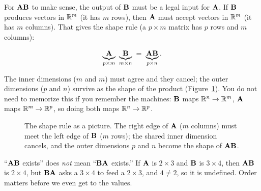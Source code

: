For $\mathbf{A}\mathbf{B}$ to make sense, the output of $\mathbf{B}$ must be a legal input for
$\mathbf{A}$. If $\mathbf{B}$ produces vectors in $\mathbb{R}^m$ (it has $m$ rows), then $\mathbf{A}$
must accept vectors in $\mathbb{R}^m$ (it has $m$ columns). That gives the shape rule
(a $p\times m$ matrix has $p$ rows and $m$ columns):

\[
\underbrace{\mat{A}}_{p \times m}\ \underbrace{\mat{B}}_{m \times n}
\;=\; \underbrace{\mat{A}\mat{B}}_{p \times n}.
\]

The inner dimensions ($m$ and $m$) must agree and they cancel; the outer dimensions
($p$ and $n$) survive as the shape of the product (Figure~\ref{ch08:shaperule}).
You do not need to memorize this if you remember the machines: $\mathbf{B}$ maps
$\mathbb{R}^n \to \mathbb{R}^m$, $\mathbf{A}$ maps $\mathbb{R}^m \to \mathbb{R}^p$, so doing both maps $\mathbb{R}^n \to \mathbb{R}^p$.

\begin{figure}[H]
\centering
{}
\caption{The shape rule as a picture. The right edge of $\mathbf{A}$ ($m$ columns) must
meet the left edge of $\mathbf{B}$ ($m$ rows); the shared inner dimension cancels, and the
outer dimensions $p$ and $n$ become the shape of $\mathbf{A}\mathbf{B}$.}
\label{ch08:shaperule}
\end{figure}

\begin{trapbox}
``$\mathbf{A}\mathbf{B}$ exists'' does \emph{not} mean ``$\mathbf{B}\mathbf{A}$ exists.'' If
$\mathbf{A}$ is $2\times 3$ and $\mathbf{B}$ is $3\times 4$, then $\mathbf{A}\mathbf{B}$ is
$2\times 4$, but $\mathbf{B}\mathbf{A}$ asks a $3\times4$ to feed a $2\times3$,
and $4 \ne 2$, so it is undefined. Order matters before we even get to the values.
\end{trapbox}

